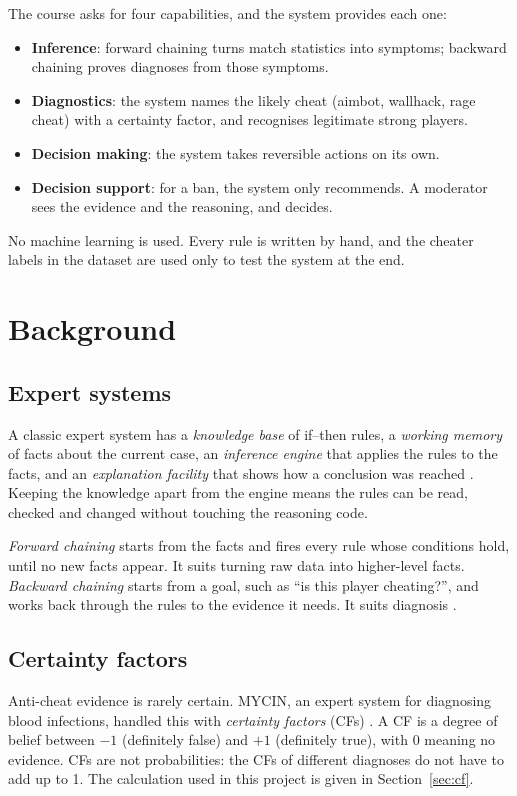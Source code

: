 \documentclass[11pt,a4paper]{article}
\begin{document}
The course asks for four capabilities, and the system provides each one:
\begin{itemize}
  \item \textbf{Inference}: forward chaining turns match statistics into symptoms; backward
        chaining proves diagnoses from those symptoms.
  \item \textbf{Diagnostics}: the system names the likely cheat (aimbot, wallhack, rage cheat) with a
        certainty factor, and recognises legitimate strong players.
  \item \textbf{Decision making}: the system takes reversible actions on its own.
  \item \textbf{Decision support}: for a ban, the system only recommends. A moderator sees the
        evidence and the reasoning, and decides.
\end{itemize}

No machine learning is used. Every rule is written by hand, and the cheater labels in the
dataset are used only to test the system at the end.

\section{Background}

\subsection{Expert systems}
A classic expert system has a \emph{knowledge base} of if--then rules, a \emph{working memory} of
facts about the current case, an \emph{inference engine} that applies the rules to the facts, and an
\emph{explanation facility} that shows how a conclusion was reached
\cite{giarratano2005,russell2020}. Keeping the knowledge apart from the engine means the rules can be
read, checked and changed without touching the reasoning code.

\emph{Forward chaining} starts from the facts and fires every rule whose conditions hold, until no new
facts appear. It suits turning raw data into higher-level facts. \emph{Backward chaining} starts from
a goal, such as ``is this player cheating?'', and works back through the rules to the evidence it
needs. It suits diagnosis \cite{russell2020}.

\subsection{Certainty factors}
Anti-cheat evidence is rarely certain. MYCIN, an expert system for diagnosing blood infections,
handled this with \emph{certainty factors} (CFs) \cite{shortliffe1975,buchanan1984}. A CF is a
degree of belief between $-1$ (definitely false) and $+1$ (definitely true), with $0$ meaning no
evidence. CFs are not probabilities: the CFs of different diagnoses do not have to add up to 1. The
calculation used in this project is given in Section~\ref{sec:cf}.
\end{document}
